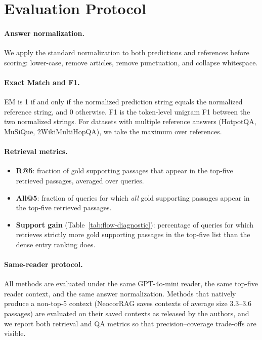 \section{Evaluation Protocol}
\label{app:evaluation}

\paragraph{Answer normalization.}
We apply the standard \citet{rajpurkar2016squad} normalization to both
predictions and references before scoring: lower-case, remove
articles, remove punctuation, and collapse whitespace.

\paragraph{Exact Match and F1.}
EM is 1 if and only if the normalized prediction string equals the
normalized reference string, and 0 otherwise. F1 is the token-level
unigram F1 between the two normalized strings. For datasets with
multiple reference answers (HotpotQA, MuSiQue, 2WikiMultiHopQA), we
take the maximum over references.

\paragraph{Retrieval metrics.}
\begin{itemize}
\item \textbf{R@5}: fraction of gold supporting passages that appear
in the top-five retrieved passages, averaged over queries.
\item \textbf{All@5}: fraction of queries for which \emph{all} gold
supporting passages appear in the top-five retrieved passages.
\item \textbf{Support gain} (Table~\ref{tab:flow-diagnostic}):
percentage of queries for which \methodname{} retrieves strictly more
gold supporting passages in the top-five list than the dense entry
ranking does.
\end{itemize}

\paragraph{Same-reader protocol.}
All methods are evaluated under the same GPT-4o-mini reader, the same
top-five reader context, and the same answer normalization. Methods
that natively produce a non-top-5 context (NeocorRAG saves contexts
of average size 3.3--3.6 passages) are evaluated on their saved
contexts as released by the authors, and we report both retrieval and
QA metrics so that precision--coverage trade-offs are visible.

